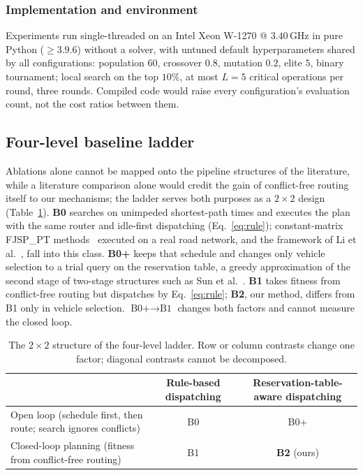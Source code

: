\documentclass[manuscript,screen,review]{acmart}
\begin{document}
\subsubsection{Implementation and environment}
\label{sec:impl}
Experiments run single-threaded on an Intel Xeon W-1270 @ $3.40$\,GHz in pure Python ($\ge 3.9.6$) without a solver, with untuned default hyperparameters shared by all configurations: population $60$, crossover $0.8$, mutation $0.2$, elite $5$, binary tournament; local search on the top $10\%$, at most $L=5$ critical operations per round, three rounds.
Compiled code would raise every configuration's evaluation count, not the cost ratios between them.

\subsection{Four-level baseline ladder}
\label{sec:arms}

Ablations alone cannot be mapped onto the pipeline structures of the literature, while a literature comparison alone would credit the gain of conflict-free routing itself to our mechanisms; the ladder serves both purposes as a $2\times2$ design (Table~\ref{tab:arms}).
\textbf{B0} searches on unimpeded shortest-path times and executes the plan with the same router and idle-first dispatching (Eq.~\eqref{eq:rule}); constant-matrix FJSP\_PT methods~\cite{meng2025cp,qin2026knowledge,jafarian2026integrated} executed on a real road network, and the framework of Li et al.~\cite{li2026framework}, fall into this class.
\textbf{B0+} keeps that schedule and changes only vehicle selection to a trial query on the reservation table, a greedy approximation of the second stage of two-stage structures such as Sun et al.~\cite{sun2023integrated}.
\textbf{B1} takes fitness from conflict-free routing but dispatches by Eq.~\eqref{eq:rule}; \textbf{B2}, our method, differs from B1 only in vehicle selection.
$\text{B0+}\to\text{B1}$ changes both factors and cannot measure the closed loop.

\begin{table}[t]
\caption{The $2\times2$ structure of the four-level ladder. Row or column contrasts change one factor; diagonal contrasts cannot be decomposed.}
\label{tab:arms}
\footnotesize
\begin{tabular}{@{}lcc@{}}
\toprule
 & Rule-based dispatching & Reservation-table-aware dispatching \\
\midrule
Open loop (schedule first, then route; search ignores conflicts) & B0 & B0+ \\
Closed-loop planning (fitness from conflict-free routing) & B1 & \textbf{B2} (ours) \\
\bottomrule
\end{tabular}
\end{table}
\end{document}
